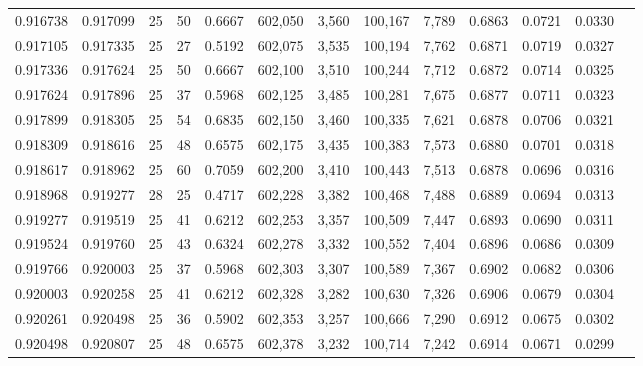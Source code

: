 \begin{tabular}{rrrrrrrrrrrrr}
0.916738 & 0.917099 &    25 &  50 &                                     0.6667 & 602,050 &   3,560 & 100,167 &   7,789 & 0.6863 & 0.0721 & 0.0330 \\
0.917105 & 0.917335 &    25 &  27 &                                     0.5192 & 602,075 &   3,535 & 100,194 &   7,762 & 0.6871 & 0.0719 & 0.0327 \\
0.917336 & 0.917624 &    25 &  50 &                                     0.6667 & 602,100 &   3,510 & 100,244 &   7,712 & 0.6872 & 0.0714 & 0.0325 \\
0.917624 & 0.917896 &    25 &  37 &                                     0.5968 & 602,125 &   3,485 & 100,281 &   7,675 & 0.6877 & 0.0711 & 0.0323 \\
0.917899 & 0.918305 &    25 &  54 &                                     0.6835 & 602,150 &   3,460 & 100,335 &   7,621 & 0.6878 & 0.0706 & 0.0321 \\
0.918309 & 0.918616 &    25 &  48 &                                     0.6575 & 602,175 &   3,435 & 100,383 &   7,573 & 0.6880 & 0.0701 & 0.0318 \\
0.918617 & 0.918962 &    25 &  60 &                                     0.7059 & 602,200 &   3,410 & 100,443 &   7,513 & 0.6878 & 0.0696 & 0.0316 \\
0.918968 & 0.919277 &    28 &  25 &                                     0.4717 & 602,228 &   3,382 & 100,468 &   7,488 & 0.6889 & 0.0694 & 0.0313 \\
0.919277 & 0.919519 &    25 &  41 &                                     0.6212 & 602,253 &   3,357 & 100,509 &   7,447 & 0.6893 & 0.0690 & 0.0311 \\
0.919524 & 0.919760 &    25 &  43 &                                     0.6324 & 602,278 &   3,332 & 100,552 &   7,404 & 0.6896 & 0.0686 & 0.0309 \\
0.919766 & 0.920003 &    25 &  37 &                                     0.5968 & 602,303 &   3,307 & 100,589 &   7,367 & 0.6902 & 0.0682 & 0.0306 \\
0.920003 & 0.920258 &    25 &  41 &                                     0.6212 & 602,328 &   3,282 & 100,630 &   7,326 & 0.6906 & 0.0679 & 0.0304 \\
0.920261 & 0.920498 &    25 &  36 &                                     0.5902 & 602,353 &   3,257 & 100,666 &   7,290 & 0.6912 & 0.0675 & 0.0302 \\
0.920498 & 0.920807 &    25 &  48 &                                     0.6575 & 602,378 &   3,232 & 100,714 &   7,242 & 0.6914 & 0.0671 & 0.0299 \\

\end{tabular}
